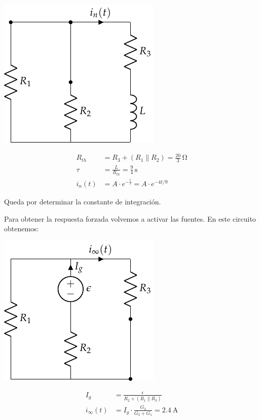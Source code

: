 \vspace{2mm}
\begin{minipage}{0.5\textwidth}
  \centering \includegraphics{figuras/FM_4_2_natural}
\end{minipage}
\begin{minipage}{0.4\textwidth}
  \begin{align*}
    R_{th} &= R_3 + (R_1 \parallel R_2) = \frac{20}{3}\,\si{\ohm}\\[3pt]
    \tau &= \frac{L}{R_{th}} = \frac{9}{4}\,\si{\second}\\[3pt]
    i_n(t) &= A \cdot e^{-\frac{t}{\tau}} = A \cdot e^{-4t/9}
  \end{align*}
\end{minipage}

\vspace{4mm}
Queda por determinar la constante de integración.

\vspace{3mm}
Para obtener la respuesta forzada volvemos a activar las fuentes. En
este circuito obtenemos:

\vspace{2mm}
\begin{minipage}{0.5\textwidth}
  \centering \includegraphics{figuras/FM_4_2_forzada}
\end{minipage}
\begin{minipage}{0.4\textwidth}
  \begin{align*}
    I_g &= \frac{\epsilon}{R_2 + (R_1 \parallel R_3)}\\[3pt]
    i_\infty(t) &= I_g \cdot \frac{G_3}{G_3 + G_1} = \SI{2.4}{\ampere}
  \end{align*}
\end{minipage}

